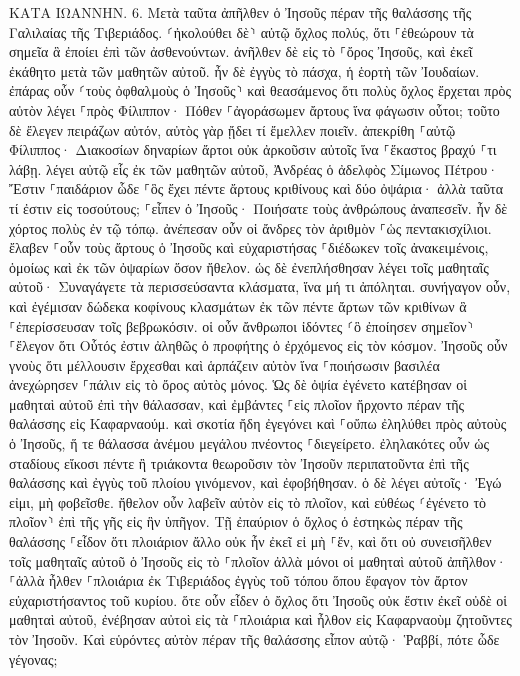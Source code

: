 \documentclass[twoside, 9pt]{extreport}
\begin{document}
ΚΑΤΑ ΙΩΑΝΝΗΝ.
6.
Μετὰ ταῦτα ἀπῆλθεν ὁ Ἰησοῦς πέραν τῆς θαλάσσης τῆς Γαλιλαίας τῆς Τιβεριάδος. 
⸂ἠκολούθει δὲ⸃ αὐτῷ ὄχλος πολύς, ὅτι ⸀ἐθεώρουν τὰ σημεῖα ἃ ἐποίει ἐπὶ τῶν ἀσθενούντων. 
ἀνῆλθεν δὲ εἰς τὸ ⸀ὄρος Ἰησοῦς, καὶ ἐκεῖ ἐκάθητο μετὰ τῶν μαθητῶν αὐτοῦ. 
ἦν δὲ ἐγγὺς τὸ πάσχα, ἡ ἑορτὴ τῶν Ἰουδαίων. 
ἐπάρας οὖν ⸂τοὺς ὀφθαλμοὺς ὁ Ἰησοῦς⸃ καὶ θεασάμενος ὅτι πολὺς ὄχλος ἔρχεται πρὸς αὐτὸν λέγει ⸀πρὸς Φίλιππον· Πόθεν ⸀ἀγοράσωμεν ἄρτους ἵνα φάγωσιν οὗτοι; 
τοῦτο δὲ ἔλεγεν πειράζων αὐτόν, αὐτὸς γὰρ ᾔδει τί ἔμελλεν ποιεῖν. 
ἀπεκρίθη ⸀αὐτῷ Φίλιππος· Διακοσίων δηναρίων ἄρτοι οὐκ ἀρκοῦσιν αὐτοῖς ἵνα ⸀ἕκαστος βραχύ ⸀τι λάβῃ. 
λέγει αὐτῷ εἷς ἐκ τῶν μαθητῶν αὐτοῦ, Ἀνδρέας ὁ ἀδελφὸς Σίμωνος Πέτρου· 
Ἔστιν ⸀παιδάριον ὧδε ⸀ὃς ἔχει πέντε ἄρτους κριθίνους καὶ δύο ὀψάρια· ἀλλὰ ταῦτα τί ἐστιν εἰς τοσούτους; 
⸀εἶπεν ὁ Ἰησοῦς· Ποιήσατε τοὺς ἀνθρώπους ἀναπεσεῖν. ἦν δὲ χόρτος πολὺς ἐν τῷ τόπῳ. ἀνέπεσαν οὖν οἱ ἄνδρες τὸν ἀριθμὸν ⸀ὡς πεντακισχίλιοι. 
ἔλαβεν ⸀οὖν τοὺς ἄρτους ὁ Ἰησοῦς καὶ εὐχαριστήσας ⸀διέδωκεν τοῖς ἀνακειμένοις, ὁμοίως καὶ ἐκ τῶν ὀψαρίων ὅσον ἤθελον. 
ὡς δὲ ἐνεπλήσθησαν λέγει τοῖς μαθηταῖς αὐτοῦ· Συναγάγετε τὰ περισσεύσαντα κλάσματα, ἵνα μή τι ἀπόληται. 
συνήγαγον οὖν, καὶ ἐγέμισαν δώδεκα κοφίνους κλασμάτων ἐκ τῶν πέντε ἄρτων τῶν κριθίνων ἃ ⸀ἐπερίσσευσαν τοῖς βεβρωκόσιν. 
οἱ οὖν ἄνθρωποι ἰδόντες ⸂ὃ ἐποίησεν σημεῖον⸃ ⸀ἔλεγον ὅτι Οὗτός ἐστιν ἀληθῶς ὁ προφήτης ὁ ἐρχόμενος εἰς τὸν κόσμον. 
Ἰησοῦς οὖν γνοὺς ὅτι μέλλουσιν ἔρχεσθαι καὶ ἁρπάζειν αὐτὸν ἵνα ⸀ποιήσωσιν βασιλέα ἀνεχώρησεν ⸀πάλιν εἰς τὸ ὄρος αὐτὸς μόνος. 
Ὡς δὲ ὀψία ἐγένετο κατέβησαν οἱ μαθηταὶ αὐτοῦ ἐπὶ τὴν θάλασσαν, 
καὶ ἐμβάντες ⸀εἰς πλοῖον ἤρχοντο πέραν τῆς θαλάσσης εἰς Καφαρναούμ. καὶ σκοτία ἤδη ἐγεγόνει καὶ ⸀οὔπω ἐληλύθει πρὸς αὐτοὺς ὁ Ἰησοῦς, 
ἥ τε θάλασσα ἀνέμου μεγάλου πνέοντος ⸀διεγείρετο. 
ἐληλακότες οὖν ὡς σταδίους εἴκοσι πέντε ἢ τριάκοντα θεωροῦσιν τὸν Ἰησοῦν περιπατοῦντα ἐπὶ τῆς θαλάσσης καὶ ἐγγὺς τοῦ πλοίου γινόμενον, καὶ ἐφοβήθησαν. 
ὁ δὲ λέγει αὐτοῖς· Ἐγώ εἰμι, μὴ φοβεῖσθε. 
ἤθελον οὖν λαβεῖν αὐτὸν εἰς τὸ πλοῖον, καὶ εὐθέως ⸂ἐγένετο τὸ πλοῖον⸃ ἐπὶ τῆς γῆς εἰς ἣν ὑπῆγον. 
Τῇ ἐπαύριον ὁ ὄχλος ὁ ἑστηκὼς πέραν τῆς θαλάσσης ⸀εἶδον ὅτι πλοιάριον ἄλλο οὐκ ἦν ἐκεῖ εἰ μὴ ⸀ἕν, καὶ ὅτι οὐ συνεισῆλθεν τοῖς μαθηταῖς αὐτοῦ ὁ Ἰησοῦς εἰς τὸ ⸀πλοῖον ἀλλὰ μόνοι οἱ μαθηταὶ αὐτοῦ ἀπῆλθον· 
⸀ἀλλὰ ἦλθεν ⸀πλοιάρια ἐκ Τιβεριάδος ἐγγὺς τοῦ τόπου ὅπου ἔφαγον τὸν ἄρτον εὐχαριστήσαντος τοῦ κυρίου. 
ὅτε οὖν εἶδεν ὁ ὄχλος ὅτι Ἰησοῦς οὐκ ἔστιν ἐκεῖ οὐδὲ οἱ μαθηταὶ αὐτοῦ, ἐνέβησαν αὐτοὶ εἰς τὰ ⸀πλοιάρια καὶ ἦλθον εἰς Καφαρναοὺμ ζητοῦντες τὸν Ἰησοῦν. 
Καὶ εὑρόντες αὐτὸν πέραν τῆς θαλάσσης εἶπον αὐτῷ· Ῥαββί, πότε ὧδε γέγονας; 
\end{document}
